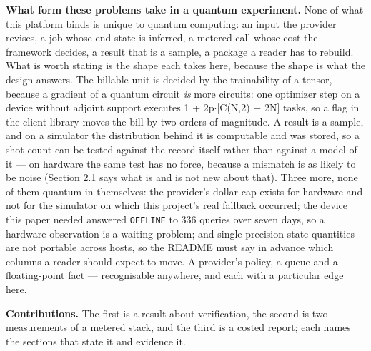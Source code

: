 \documentclass[acmsmall,screen,review]{acmart}
\begin{document}
\textbf{What form these problems take in a quantum experiment.} None of what this platform binds is unique to quantum computing: an input the provider revises, a job whose end state is inferred, a metered call whose cost the framework decides, a result that is a sample, a package a reader has to rebuild. What is worth stating is the shape each takes here, because the shape is what the design answers. The billable unit is decided by the trainability of a tensor, because a gradient of a quantum circuit \textit{is} more circuits: one optimizer step on a device without adjoint support executes 1 + 2p$\cdot$[C(N,2) + 2N] tasks, so a flag in the client library moves the bill by two orders of magnitude. A result is a sample, and on a simulator the distribution behind it is computable and was stored, so a shot count can be tested against the record itself rather than against a model of it --- on hardware the same test has no force, because a mismatch is as likely to be noise (Section 2.1 says what is and is not new about that). Three more, none of them quantum in themselves: the provider's dollar cap exists for hardware and not for the simulator on which this project's real fallback occurred; the device this paper needed answered \texttt{OFFLINE} to 336 queries over seven days, so a hardware observation is a waiting problem; and single-precision state quantities are not portable across hosts, so the README must say in advance which columns a reader should expect to move. A provider's policy, a queue and a floating-point fact --- recognisable anywhere, and each with a particular edge here.


\textbf{Contributions.} The first is a result about verification, the second is two measurements of a metered stack, and the third is a costed report; each names the sections that state it and evidence it.
\end{document}

